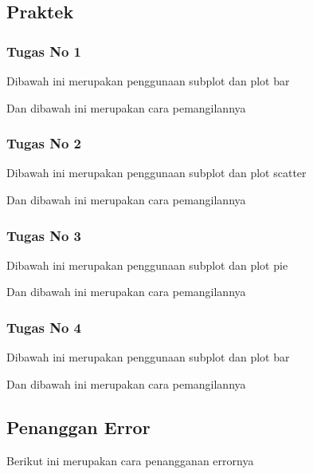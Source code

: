 \subsection{Praktek}
\subsubsection{Tugas No 1}
\hfill \break
Dibawah ini merupakan penggunaan subplot dan plot bar

Dan dibawah ini merupakan cara pemangilannya



\subsubsection{Tugas No 2}

\hfill \break

Dibawah ini merupakan penggunaan subplot dan plot scatter

Dan dibawah ini merupakan cara pemangilannya



\subsubsection{Tugas No 3}

\hfill \break

Dibawah ini merupakan penggunaan subplot dan plot pie

Dan dibawah ini merupakan cara pemangilannya



\subsubsection{Tugas No 4}

\hfill \break

Dibawah ini merupakan penggunaan subplot dan plot bar

Dan dibawah ini merupakan cara pemangilannya



\subsection{Penanggan Error}

\hfill \break

Berikut ini merupakan cara penangganan errornya
